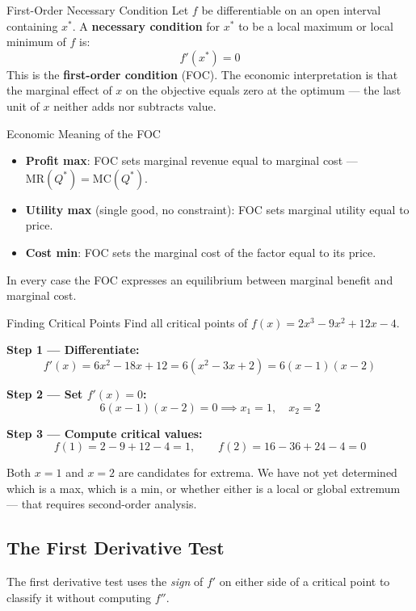 \documentclass[12pt, a4paper]{article}
\theoremstyle{definition}
\begin{document}
\begin{thmbox}{First-Order Necessary Condition}
Let $f$ be differentiable on an open interval containing $x^*$.
A \textbf{necessary condition} for $x^*$ to be a local maximum or local
minimum of $f$ is:
\[
  \boxed{f'(x^*) = 0}
\]
This is the \textbf{first-order condition} (FOC).  The economic
interpretation is that the marginal effect of $x$ on the objective equals
zero at the optimum --- the last unit of $x$ neither adds nor subtracts
value.
\end{thmbox}

\begin{keybox}{Economic Meaning of the FOC}
\begin{itemize}
  \item \textbf{Profit max}: FOC sets marginal revenue equal to marginal cost
        --- $\text{MR}(Q^*)=\text{MC}(Q^*)$.
  \item \textbf{Utility max} (single good, no constraint):
        FOC sets marginal utility equal to price.
  \item \textbf{Cost min}: FOC sets the marginal cost of the factor equal
        to its price.
\end{itemize}
In every case the FOC expresses an equilibrium between marginal benefit and
marginal cost.
\end{keybox}

\begin{exbox}{Finding Critical Points}
Find all critical points of $f(x) = 2x^3 - 9x^2 + 12x - 4$.

\textbf{Step 1 --- Differentiate:}
\[
  f'(x) = 6x^2 - 18x + 12 = 6(x^2 - 3x + 2) = 6(x-1)(x-2)
\]

\textbf{Step 2 --- Set $f'(x)=0$:}
\[
  6(x-1)(x-2) = 0 \implies x_1 = 1, \quad x_2 = 2
\]

\textbf{Step 3 --- Compute critical values:}
\[
  f(1) = 2-9+12-4 = 1, \qquad f(2) = 16-36+24-4 = 0
\]

Both $x=1$ and $x=2$ are candidates for extrema.
We have not yet determined which is a max, which is a min, or whether either
is a local or global extremum --- that requires second-order analysis.
\end{exbox}

\subsection{The First Derivative Test}

The first derivative test uses the \emph{sign} of $f'$ on either side of a
critical point to classify it without computing $f''$.
\end{document}
